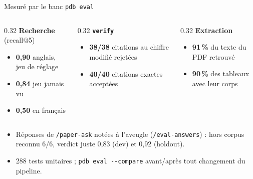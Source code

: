 \documentclass[aspectratio=169,11pt]{beamer}
\newcommand{\cmd}[1]{\texttt{\textcolor{blu}{#1}}}
\begin{document}
\begin{frame}{Mesuré par le banc \texttt{pdb eval}}
  \begin{columns}[T]
    \begin{column}{0.32\textwidth}
      \textbf{Recherche} (recall@5)
      \begin{itemize}
        \item \textbf{0,90} anglais, jeu de réglage
        \item \textbf{0,84} jeu jamais vu
        \item \textbf{0,50} en français
      \end{itemize}
    \end{column}
    \begin{column}{0.32\textwidth}
      \textbf{\cmd{verify}}
      \begin{itemize}
        \item \textbf{38/38} citations au chiffre modifié rejetées
        \item \textbf{40/40} citations exactes acceptées
      \end{itemize}
    \end{column}
    \begin{column}{0.32\textwidth}
      \textbf{Extraction}
      \begin{itemize}
        \item \textbf{91\,\%} du texte du PDF retrouvé
        \item \textbf{90\,\%} des tableaux avec leur corps
      \end{itemize}
    \end{column}
  \end{columns}
  \medskip
  \begin{itemize}
    \item Réponses de \cmd{/paper-ask} notées à l'aveugle (\cmd{/eval-answers}) : hors corpus reconnu 6/6,
          verdict juste 0,83 (dev) et 0,92 (holdout).
    \item 288 tests unitaires ; \cmd{pdb eval -{}-compare} avant/après tout changement du pipeline.
  \end{itemize}
\end{frame}
\end{document}
